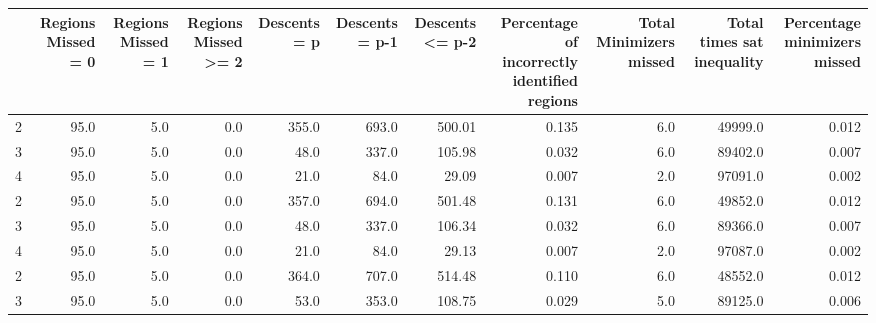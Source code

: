 \begin{tabular}{lrrrrrrrrrr}
\toprule
{} &  Regions Missed = 0 &  Regions Missed = 1 &  Regions Missed >= 2 &  Descents = p &  Descents = p-1 &  Descents <= p-2 &  Percentage of incorrectly identified regions &  Total Minimizers missed &  Total times sat inequality &  Percentage minimizers missed \\
\midrule
2 &                95.0 &                 5.0 &                  0.0 &         355.0 &           693.0 &           500.01 &                                         0.135 &                      6.0 &                     49999.0 &                         0.012 \\
3 &                95.0 &                 5.0 &                  0.0 &          48.0 &           337.0 &           105.98 &                                         0.032 &                      6.0 &                     89402.0 &                         0.007 \\
4 &                95.0 &                 5.0 &                  0.0 &          21.0 &            84.0 &            29.09 &                                         0.007 &                      2.0 &                     97091.0 &                         0.002 \\
2 &                95.0 &                 5.0 &                  0.0 &         357.0 &           694.0 &           501.48 &                                         0.131 &                      6.0 &                     49852.0 &                         0.012 \\
3 &                95.0 &                 5.0 &                  0.0 &          48.0 &           337.0 &           106.34 &                                         0.032 &                      6.0 &                     89366.0 &                         0.007 \\
4 &                95.0 &                 5.0 &                  0.0 &          21.0 &            84.0 &            29.13 &                                         0.007 &                      2.0 &                     97087.0 &                         0.002 \\
2 &                95.0 &                 5.0 &                  0.0 &         364.0 &           707.0 &           514.48 &                                         0.110 &                      6.0 &                     48552.0 &                         0.012 \\
3 &                95.0 &                 5.0 &                  0.0 &          53.0 &           353.0 &           108.75 &                                         0.029 &                      5.0 &                     89125.0 &                         0.006 \\

\end{tabular}
